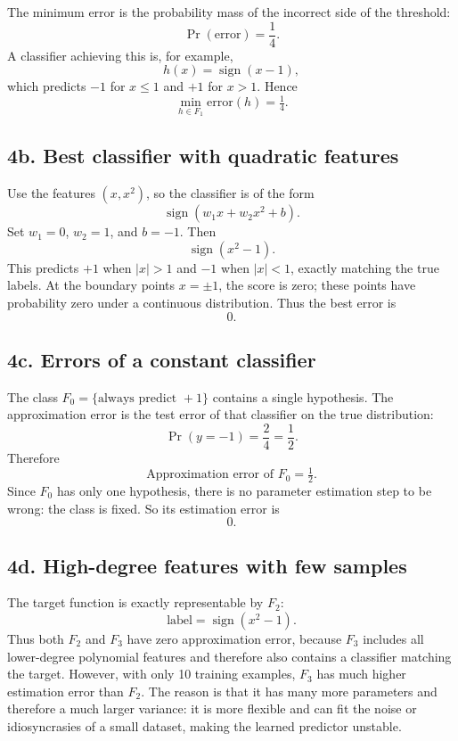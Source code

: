 \documentclass[11pt]{article}
\begin{document}
The minimum error is the probability mass of the incorrect side of the threshold:
\[
\Pr(\text{error}) = \frac{1}{4}.
\]
A classifier achieving this is, for example,
\[
h(x)=\operatorname{sign}(x-1),
\]
which predicts $-1$ for $x\le 1$ and $+1$ for $x>1$.
Hence
\[
\boxed{\min_{h\in F_1}\text{error}(h)=\tfrac14.}
\]

\subsection*{4b. Best classifier with quadratic features}

Use the features $(x,x^2)$, so the classifier is of the form
\[
\operatorname{sign}(w_1x+w_2x^2+b).
\]
Set $w_1=0$, $w_2=1$, and $b=-1$. Then
\[
\operatorname{sign}(x^2-1).
\]
This predicts $+1$ when $|x|>1$ and $-1$ when $|x|<1$, exactly matching the true labels. At the boundary points $x=\pm 1$, the score is zero; these points have probability zero under a continuous distribution.
Thus the best error is
\[
\boxed{0.}
\]

\subsection*{4c. Errors of a constant classifier}

The class $F_0=\{\text{always predict } +1\}$ contains a single hypothesis.
The approximation error is the test error of that classifier on the true distribution:
\[
\Pr(y=-1)=\frac{2}{4}=\frac12.
\]
Therefore
\[
\boxed{\text{Approximation error of }F_0 = \tfrac12.}
\]
Since $F_0$ has only one hypothesis, there is no parameter estimation step to be wrong: the class is fixed. So its estimation error is
\[
\boxed{0.}
\]

\subsection*{4d. High-degree features with few samples}

The target function is exactly representable by $F_2$:
\[
\text{label}=\operatorname{sign}(x^2-1).
\]
Thus both $F_2$ and $F_3$ have zero approximation error, because $F_3$ includes all lower-degree polynomial features and therefore also contains a classifier matching the target.
However, with only 10 training examples, $F_3$ has much higher estimation error than $F_2$. The reason is that it has many more parameters and therefore a much larger variance: it is more flexible and can fit the noise or idiosyncrasies of a small dataset, making the learned predictor unstable.
\end{document}
